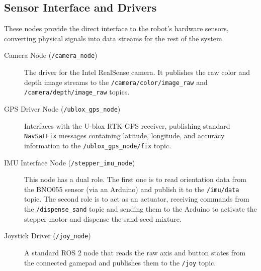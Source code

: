 


\subsection{Sensor Interface and Drivers}
These nodes provide the direct interface to the robot's hardware sensors, converting physical signals into data streams for the rest of the system.
\begin{description}
    \item[Camera Node (\texttt{/camera\_node})] The driver for the Intel RealSense camera. It publishes the raw color and depth image streams to the \texttt{/camera/color/image\_raw} and \texttt{/camera/depth/image\_raw} topics.
    \item[GPS Driver Node (\texttt{/ublox\_gps\_node})] Interfaces with the U-blox RTK-GPS receiver, publishing standard \texttt{NavSatFix} messages containing latitude, longitude, and accuracy information to the \texttt{/ublox\_gps\_node/fix} topic.
    \item[IMU Interface Node (\texttt{/stepper\_imu\_node})] This node has a dual role. The first one is to read orientation data from the BNO055 sensor (via an Arduino) and publish it to the \texttt{/imu/data} topic. The second role is to act as an actuator, receiving commands from the \texttt{/dispense\_sand} topic and sending them to the Arduino to activate the stepper motor and dispense the sand-seed mixture.
    \item[Joystick Driver (\texttt{/joy\_node})] A standard ROS 2 node that reads the raw axis and button states from the connected gamepad and publishes them to the \texttt{/joy} topic.
\end{description}

